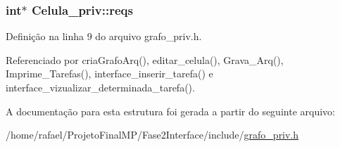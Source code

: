\hypertarget{structCelula__priv_ad54839cd4d96e78a58c226ab2e8d0579}{}
\subsubsection[{reqs}]{\setlength{\rightskip}{0pt plus 5cm}int$\ast$ Celula\+\_\+priv\+::reqs}\label{structCelula__priv_ad54839cd4d96e78a58c226ab2e8d0579}


Definição na linha 9 do arquivo grafo\+\_\+priv.\+h.



Referenciado por cria\+Grafo\+Arq(), editar\+\_\+celula(), Grava\+\_\+\+Arq(), Imprime\+\_\+\+Tarefas(), interface\+\_\+inserir\+\_\+tarefa() e interface\+\_\+vizualizar\+\_\+determinada\+\_\+tarefa().



A documentação para esta estrutura foi gerada a partir do seguinte arquivo\+:\begin{DoxyCompactItemize}
\item 
/home/rafael/\+Projeto\+Final\+M\+P/\+Fase2\+Interface/include/\hyperlink{grafo__priv_8h}{grafo\+\_\+priv.\+h}\end{DoxyCompactItemize}
